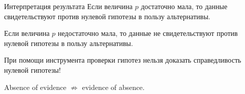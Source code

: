 \documentclass[9pt,pdf,utf8,hyperref={unicode},aspectratio=169]{beamer}
\begin{document}
\begin{frame}{Интерпретация результата}
	Если величина $p$ достаточно мала, то данные свидетельствуют против нулевой гипотезы в пользу альтернативы.
	
	Если величина $p$ недостаточно мала, то данные не свидетельствуют против нулевой гипотезы в пользу альтернативы.
	
	\bigskip
	
	При помощи инструмента проверки гипотез нельзя доказать справедливость нулевой гипотезы!
	
	Absence of evidence $\nRightarrow$ evidence of absence.
\end{frame}
\end{document}

